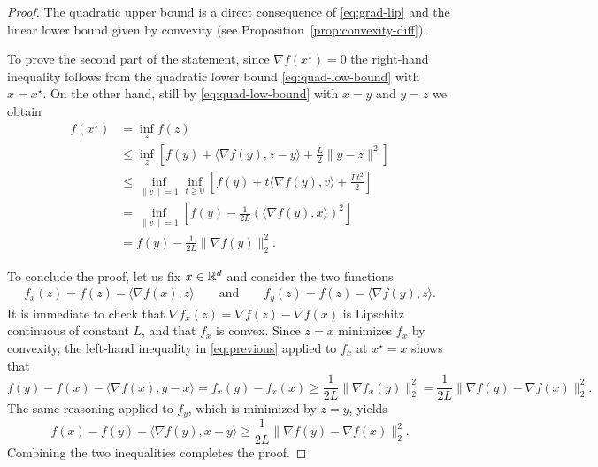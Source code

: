 \documentclass{report}
\begin{document}
\begin{proof}
	The quadratic upper bound is a direct consequence of \eqref{eq:grad-lip} and the linear lower bound given by convexity (see Proposition~\ref{prop:convexity-diff}).

	To prove the second part of the statement, since $\nabla f(x^\star) =0$ the right-hand inequality follows from the quadratic lower bound \eqref{eq:quad-low-bound} with $x=x^\star$. On the other hand, still by \eqref{eq:quad-low-bound} with $x=y$ and $y=z$ we obtain 
	\begin{equation}
		\begin{split}
			f(x^\star) 
			&= \inf_{z} f(z) \\
			&\le \inf_z \left[ f(y) + \langle \nabla f(y), z-y \rangle + \frac{L}2 \|y-z\|^2 \right]\\
			&\le \inf_{\|v\|=1} \inf_{t\ge 0} \left[ f(y) + t\langle \nabla f(y), v \rangle + \frac{Lt^2}2  \right]\\
			&= \inf_{\|v\|=1} \left[ f(y) - \frac{1}{2L} \left(\langle \nabla f(y),x\rangle\right)^2 \right]\\
			&= f(y) - \frac{1}{2L} \|\nabla f(y)\|_2^2.
		\end{split}
	\end{equation}

	To conclude the proof, let us fix $x\in \mathbb{R}^d$ and consider the two functions
	\begin{eqnarray}
		f_x(z) = f(z)-\langle \nabla f(x),z\rangle
		\qquad\text{and}\qquad
		f_y(z) = f(z)-\langle \nabla f(y),z\rangle.
	\end{eqnarray}
	It is immediate to check that $\nabla f_x(z) = \nabla f(z)-\nabla f(x)$ is Lipschitz continuous of constant $L$, and that $f_x$ is convex. 
	Since $z=x$ minimizes $f_x$ by convexity, the left-hand inequality in \eqref{eq:previous} applied to $f_x$ at $x^\star =x$ shows that 
	\begin{equation}
		f(y)-f(x)-\langle \nabla f(x),y-x \rangle = f_x(y)-f_x(x) \ge \frac{1}{2L}\|\nabla f_x(y)\|_2^2 = \frac{1}{2L}\|\nabla f(y)-\nabla f(x)\|_2^2.
	\end{equation} 
	The same reasoning applied to $f_y$, which is minimized by $z=y$, yields 
	\begin{equation}
		f(x)-f(y)-\langle \nabla f(y),x-y \rangle \ge \frac{1}{2L}\|\nabla f(y)-\nabla f(x)\|_2^2.
	\end{equation}
	Combining the two inequalities completes the proof.
\end{proof}
\end{document}
